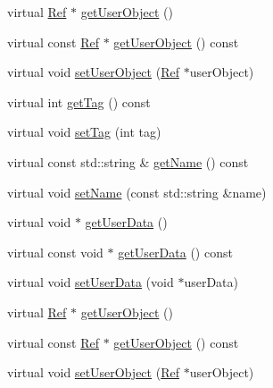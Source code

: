 \begin{Indent}
\begin{DoxyCompactItemize}
virtual \hyperlink{classRef}{Ref} $\ast$ \hyperlink{classNode_a246218e1f2be9fc931be00c9c42a7817}{get\+User\+Object} ()
\item 
virtual const \hyperlink{classRef}{Ref} $\ast$ \hyperlink{classNode_a6bc05a48edd6e805bbe970fd62a4a48d}{get\+User\+Object} () const
\item 
virtual void \hyperlink{classNode_aa9ccf509ea89dcbd94e3b1d383aeda6f}{set\+User\+Object} (\hyperlink{classRef}{Ref} $\ast$user\+Object)
\item 
virtual int \hyperlink{classNode_ac148c44055cf3d6344326b5bbb3ccd26}{get\+Tag} () const
\item 
virtual void \hyperlink{classNode_ad07179e61008c76e7a996636267c74a5}{set\+Tag} (int tag)
\item 
virtual const std\+::string \& \hyperlink{classNode_a484b1fc5cd08d0b422fc4051b125ea44}{get\+Name} () const
\item 
virtual void \hyperlink{classNode_a09a7d879835c2d3fbcbcdcd8f415938a}{set\+Name} (const std\+::string \&name)
\item 
virtual void $\ast$ \hyperlink{classNode_afeacb9cc8c8730d3ee8359ef42d5318d}{get\+User\+Data} ()
\item 
virtual const void $\ast$ \hyperlink{classNode_a8f7eb64c4811677bc4ea83562981caf6}{get\+User\+Data} () const
\item 
virtual void \hyperlink{classNode_a9dd8dc715df27f90ec04f795495836d7}{set\+User\+Data} (void $\ast$user\+Data)
\item 
virtual \hyperlink{classRef}{Ref} $\ast$ \hyperlink{classNode_a246218e1f2be9fc931be00c9c42a7817}{get\+User\+Object} ()
\item 
virtual const \hyperlink{classRef}{Ref} $\ast$ \hyperlink{classNode_a6bc05a48edd6e805bbe970fd62a4a48d}{get\+User\+Object} () const
\item 
virtual void \hyperlink{classNode_a306c369ecb71feb0206b277d9bf81fab}{set\+User\+Object} (\hyperlink{classRef}{Ref} $\ast$user\+Object)
\end{DoxyCompactItemize}
\end{Indent}

